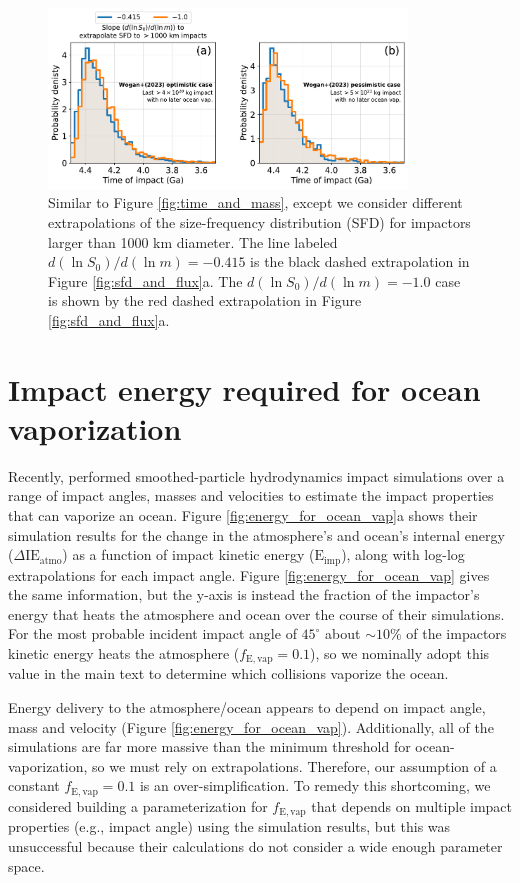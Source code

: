 \documentclass[manuscript]{aastex63}
\begin{document}
\begin{figure}
  \centering
  \includegraphics[width=0.85\textwidth]{figures/timing_extrapolation_sensitivity.pdf}
  \caption{Similar to Figure \ref{fig:time_and_mass}, except we consider different extrapolations of the size-frequency distribution (SFD) for impactors larger than 1000 km diameter. The line labeled $d (\ln S_0)/d (\ln m) = - 0.415$ is the black dashed extrapolation in Figure \ref{fig:sfd_and_flux}a. The $d (\ln S_0)/d (\ln m) = - 1.0$ case is shown by the red dashed extrapolation in Figure \ref{fig:sfd_and_flux}a.}
  \label{fig:timing_extrapolation_sensitivity}
\end{figure}

\section{Impact energy required for ocean vaporization} \label{sec:append_vap}

Recently, \citet{Citron_2022} performed smoothed-particle hydrodynamics impact simulations over a range of impact angles, masses and velocities to estimate the impact properties that can vaporize an ocean. Figure \ref{fig:energy_for_ocean_vap}a shows their simulation results for the change in the atmosphere's and ocean's internal energy ($\Delta \mathrm{IE}_\mathrm{atmo}$) as a function of impact kinetic energy ($\mathrm{E}_\mathrm{imp}$), along with log-log extrapolations for each impact angle. Figure \ref{fig:energy_for_ocean_vap} gives the same information, but the y-axis is instead the fraction of the impactor's energy that heats the atmosphere and ocean over the course of their simulations. For the most probable incident impact angle of $45^\circ$ about $\sim 10\%$ of the impactors kinetic energy heats the atmosphere ($f_\mathrm{E,vap} = 0.1$), so we nominally adopt this value in the main text to determine which collisions vaporize the ocean.

Energy delivery to the atmosphere/ocean appears to depend on impact angle, mass and velocity (Figure \ref{fig:energy_for_ocean_vap}). Additionally, all of the \citet{Citron_2022} simulations are far more massive than the minimum threshold for ocean-vaporization, so we must rely on extrapolations. Therefore, our assumption of a constant $f_\mathrm{E,vap} = 0.1$ is an over-simplification. To remedy this shortcoming, we considered building a parameterization for $f_\mathrm{E,vap}$ that depends on multiple impact properties (e.g., impact angle) using the \citet{Citron_2022} simulation results, but this was unsuccessful because their calculations do not consider a wide enough parameter space.
\end{document}
